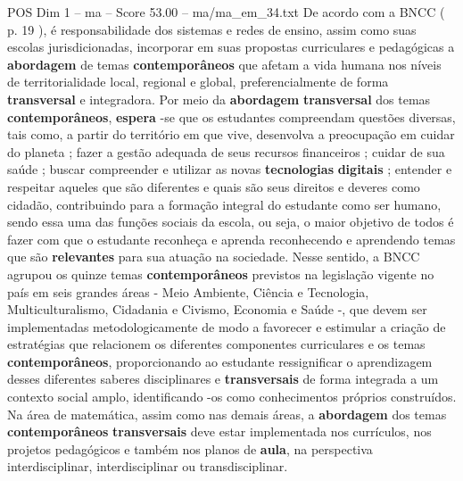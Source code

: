 \begin{textsample}{POS Dim 1 – ma – Score 53.00 – ma/ma\_em\_34.txt}
De acordo com a BNCC ( p. 19 ), é responsabilidade dos sistemas e redes de ensino, assim como suas escolas jurisdicionadas, incorporar em suas propostas curriculares e pedagógicas a \textbf{abordagem} de temas \textbf{contemporâneos} que afetam a vida humana nos níveis de territorialidade local, regional e global, preferencialmente de forma \textbf{transversal} e integradora.
Por meio da \textbf{abordagem} \textbf{transversal} dos temas \textbf{contemporâneos}, \textbf{espera} -se que os estudantes compreendam questões diversas, tais como, a partir do território em que vive, desenvolva a preocupação em cuidar do planeta ; fazer a gestão adequada de seus recursos financeiros ; cuidar de sua saúde ; buscar compreender e utilizar as novas \textbf{tecnologias} \textbf{digitais} ; entender e respeitar aqueles que são diferentes e quais são seus direitos e deveres como cidadão, contribuindo para a formação integral do estudante como ser humano, sendo essa uma das funções sociais da escola, ou seja, o maior objetivo de todos é fazer com que o estudante reconheça e aprenda reconhecendo e aprendendo temas que são \textbf{relevantes} para sua atuação na sociedade.
Nesse sentido, a BNCC agrupou os quinze temas \textbf{contemporâneos} previstos na legislação vigente no país em seis grandes áreas - Meio Ambiente, Ciência e Tecnologia, Multiculturalismo, Cidadania e Civismo, Economia e Saúde -, que devem ser implementadas metodologicamente de modo a favorecer e estimular a criação de estratégias que relacionem os diferentes componentes curriculares e os temas \textbf{contemporâneos}, proporcionando ao estudante ressignificar o aprendizagem desses diferentes saberes disciplinares e \textbf{transversais} de forma integrada a um contexto social amplo, identificando -os como conhecimentos próprios construídos.
Na área de matemática, assim como nas demais áreas, a \textbf{abordagem} dos temas \textbf{contemporâneos} \textbf{transversais} deve estar implementada nos currículos, nos projetos pedagógicos e também nos planos de \textbf{aula}, na perspectiva interdisciplinar, interdisciplinar ou transdisciplinar.

\end{textsample}
